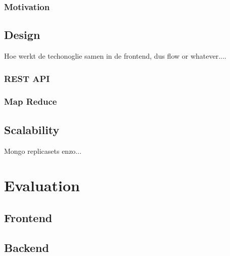 \documentclass{report}
\begin{document}
\subsection{Motivation}

\section{Design}
Hoe werkt de techonoglie samen in de frontend, dus flow or whatever....

\subsection{REST API}

\subsection{Map Reduce}

\section{Scalability}
Mongo replicasets enzo...

\chapter{Evaluation}

\section{Frontend}

\section{Backend}
\end{document}
